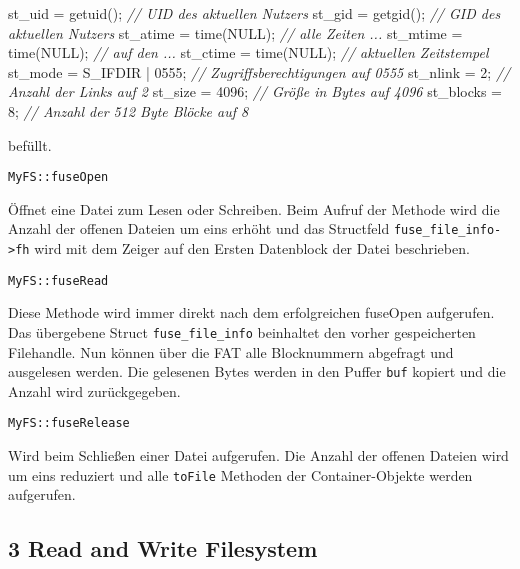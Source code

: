 \documentclass[]{article}
\newenvironment{Shaded}{}{}
\newcommand{\CommentTok}[1]{\textcolor[rgb]{0.38,0.63,0.69}{\textit{#1}}}
\newcommand{\DecValTok}[1]{\textcolor[rgb]{0.25,0.63,0.44}{#1}}
\newcommand{\NormalTok}[1]{#1}
\begin{document}
\begin{Shaded}
  \begin{framed}
\begin{Highlighting}[]
\NormalTok{st_uid = getuid();        }\CommentTok{// UID des aktuellen Nutzers}
\NormalTok{st_gid = getgid();        }\CommentTok{// GID des aktuellen Nutzers}
\NormalTok{st_atime = time(NULL);    }\CommentTok{// alle Zeiten ...}
\NormalTok{st_mtime = time(NULL);    }\CommentTok{// auf den ...}
\NormalTok{st_ctime = time(NULL);    }\CommentTok{// aktuellen Zeitstempel}
\NormalTok{st_mode = S_IFDIR | }\DecValTok{0555}\NormalTok{; }\CommentTok{// Zugriffsberechtigungen auf 0555}
\NormalTok{st_nlink = }\DecValTok{2}\NormalTok{;             }\CommentTok{// Anzahl der Links auf 2}
\NormalTok{st_size = }\DecValTok{4096}\NormalTok{;           }\CommentTok{// Größe in Bytes auf 4096}
\NormalTok{st_blocks = }\DecValTok{8}\NormalTok{;            }\CommentTok{// Anzahl der 512 Byte Blöcke auf 8}
\end{Highlighting}
\end{framed}
\end{Shaded}

befüllt.

\texttt{MyFS::fuseOpen}

Öffnet eine Datei zum Lesen oder Schreiben. Beim Aufruf der Methode wird
die Anzahl der offenen Dateien um eins erhöht und das Structfeld
\texttt{fuse\_file\_info-\textgreater{}fh} wird mit dem Zeiger auf den
Ersten Datenblock der Datei beschrieben.

\texttt{MyFS::fuseRead}

Diese Methode wird immer direkt nach dem erfolgreichen fuseOpen
aufgerufen. Das übergebene Struct \texttt{fuse\_file\_info} beinhaltet
den vorher gespeicherten Filehandle. Nun können über die FAT alle
Blocknummern abgefragt und ausgelesen werden. Die gelesenen Bytes werden in den
Puffer \texttt{buf} kopiert und die Anzahl wird zurückgegeben.

\texttt{MyFS::fuseRelease}

Wird beim Schließen einer Datei aufgerufen. Die Anzahl der offenen
Dateien wird um eins reduziert und alle \texttt{toFile} Methoden der
Container-Objekte werden aufgerufen.

\hypertarget{read-and-write-filesystem}{%
\subsection{3 Read and Write
Filesystem}\label{read-and-write-filesystem}}
\end{document}
